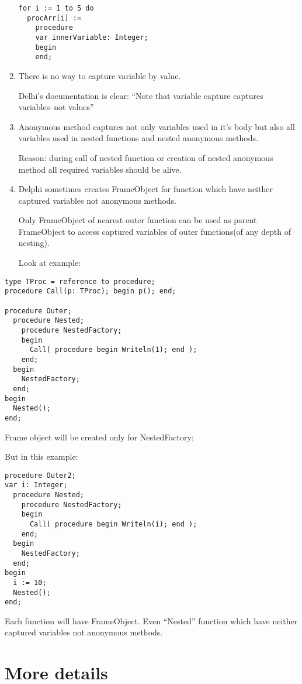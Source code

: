 \documentclass[11pt]{article}
\begin{document}
\begin{enumerate}
\begin{verbatim}
for i := 1 to 5 do
  procArr[i] :=
    procedure
    var innerVariable: Integer;
    begin    
    end;
\end{verbatim}
\item There is no way to capture variable by value.

   Delhi's documentation is clear: ``Note that variable capture captures
   variables--not values''
\item Anonymous method captures not only variables used in it's body but
   also all variables used in nested functions and nested anonymous
   methods.

   Reason: during call of nested function or creation of nested
   anonymous method all required variables should be alive.
\item Delphi sometimes creates FrameObject for function which have
   neither captured variables not anonymous methods.

   Only FrameObject of nearest outer function can be used
   as parent FrameObject to access captured variables of outer
   functions(of any depth of nesting).
   
   Look at example:
\end{enumerate}

\begin{verbatim}
type TProc = reference to procedure;
procedure Call(p: TProc); begin p(); end;

procedure Outer;
  procedure Nested;
    procedure NestedFactory;
    begin
      Call( procedure begin Writeln(1); end );
    end;
  begin
    NestedFactory;
  end;
begin
  Nested();
end;
\end{verbatim}
   Frame object will be created only for NestedFactory;

   But in this example:

\begin{verbatim}
procedure Outer2;
var i: Integer;
  procedure Nested;
    procedure NestedFactory;
    begin
      Call( procedure begin Writeln(i); end );
    end;
  begin
    NestedFactory;
  end;
begin
  i := 10;
  Nested();
end;
\end{verbatim}
   Each function will have FrameObject. Even ``Nested'' function which
   have neither captured variables not anonymous methods.  
\section{More details}
\label{sec-6}
\end{document}
